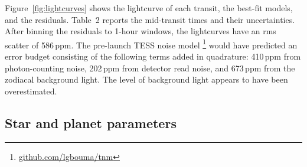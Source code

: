\documentclass[12pt,twocolumn,tighten]{aastex62}
\begin{document}
Figure~\ref{fig:lightcurves} shows the lightcurve of each transit, the
best-fit models, and the residuals.  Table~2 reports the mid-transit
times and their uncertainties.  After binning the residuals to 1-hour
windows, the lightcurves have an rms scatter of 586\,{\rm ppm}.  The
pre-launch TESS noise model \citep{winn_photonflux_2013,Sullivan_2015}
\footnote{\url{github.com/lgbouma/tnm}} would have predicted an error
budget consisting of the following terms added in quadrature:
410\,{\rm ppm} from photon-counting noise, 202\,{\rm ppm} from
detector read noise, and 673\,{\rm ppm} from the zodiacal background
light.  The level of background light appears to have been
overestimated.

\subsection{Star and planet parameters}
\label{sec:system_parameters}
\end{document}
